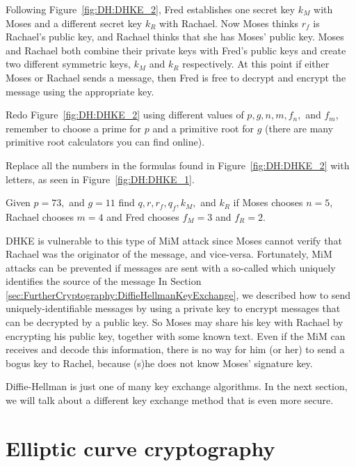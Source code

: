 Following Figure~\ref{fig:DH:DHKE_2}, Fred establishes one secret key $k_M$ with Moses and a different secret key $k_R$ with Rachael.  Now Moses thinks $r_f$ is Rachael's public key, and Rachael thinks that she has Moses' public key. Moses and Rachael both combine their private keys with Fred's public keys and create two different symmetric keys, $k_M$ and $k_R$ respectively. At this point if either Moses or Rachael sends a message, then Fred is free to decrypt and encrypt the message using the appropriate key. 

\begin{exercise}{}
Redo Figure~\ref{fig:DH:DHKE_2} using different values of $p, g, n,m, f_n,$ and $f_m$, remember to choose a prime for $p$ and a primitive root for $g$ (there are many primitive root calculators you can find online).
\end{exercise}

\begin{exercise}{}
Replace all the numbers in the formulas found in Figure~\ref{fig:DH:DHKE_2} with letters, as seen in Figure~\ref{fig:DH:DHKE_1}.
\end{exercise}

\begin{exercise}{}
Given $p=73,$ and $g=11$ find $q, r, r_f, q_f, k_M,$ and $k_R$ if Moses chooses $n=5$, Rachael chooses $m=4$ and Fred chooses $f_M=3$ and $f_R=2$.
\end{exercise}

DHKE is vulnerable to this type of MiM attack since Moses cannot verify that Rachael was the originator of the message, and vice-versa.  Fortunately,  MiM attacks can be prevented if messages are sent with a so-called  which uniquely identifies the source of the message   In Section \ref{sec:FurtherCryptography:DiffieHellmanKeyExchange}, we described how to send uniquely-identifiable messages by using a private key to encrypt  messages that can be decrypted by a public key.  So Moses may share his key with Rachael by encrypting his public key, together with some known text. Even if the MiM can receives and decode this information, there is no way for him (or her) to send a bogus key to Rachel, because (s)he does not know Moses' signature key.  

 Diffie-Hellman is just one of many key exchange algorithms. In the next section, we will talk about a different key exchange method that is even more secure.

\section{Elliptic curve cryptography}
\label{sec:FurtherCryptography:EllipticalCurve}

